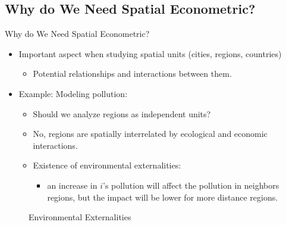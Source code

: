 \documentclass[english,10pt]{beamer}\usepackage[]{graphicx}\usepackage[]{xcolor}
\begin{document}
\subsection{Why do We Need Spatial Econometric?}

\begin{frame}{Why do We Need Spatial Econometric?}
  \begin{itemize}
    \item Important aspect when studying spatial units (cities, regions, countries)
      \begin{itemize}
        \item Potential relationships and interactions between them. 
      \end{itemize}
    \item Example: Modeling pollution:
      \begin{itemize}
        \item Should we analyze regions as independent units?
        \item No, regions are spatially interrelated by ecological and economic interactions.
        \item Existence of environmental externalities:
          \begin{itemize}
            \item an increase in $i$'s pollution will affect the pollution in neighbors regions, but the impact will be lower for more distance regions. 
          \end{itemize}
      \end{itemize}
  \end{itemize}
\end{frame}

\begin{frame}
\begin{figure}[h]
\caption{Environmental Externalities}
\label{fig:example_poll}
\centering
{}
\end{figure}
\end{frame}
\end{document}
